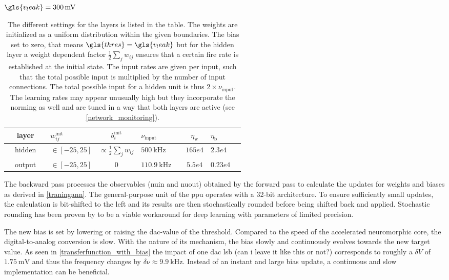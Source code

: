$\gls{v_leak} = \SI{300}{\milli \V}$
\begin{table}\centering{}
	\begin{tabular}{@{}rcllcllcll@{}}\toprule
		&layer	 & & $w_{ij}^\text{init}$		& $b_i^\text{init}$ & $\nu_{\text{input}}$	& & $\eta_\text{w}$	& $\eta_\text{b}$\\ \midrule
		&hidden  & & $\in[-25, 25]$	& $\propto \frac{1}{2} \sum_j w_{ij}$ & $\SI{500}{\kilo \Hz}$	& & $165e4$			& $2.3e4$		\\
		&output  & & $\in[-25, 25]$	& $0$ & $\SI{110.9}{\kilo\Hz}$& & $5.5e4$			& $0.23e4$		\\ \bottomrule
	\end{tabular}
	\caption{The different settings for the layers is listed in the table. The weights are initialized as a uniform distribution within the given boundaries. The bias set to zero, that means $\gls{thres} = \gls{v_leak}$ but for the hidden layer a weight dependent factor $\frac{1}{2} \sum_j w_{ij}$ ensures that a certain fire rate is established at the initial state. The input rates are given per input, such that the total possible input is multiplied by the number of input connections. The total possible input for a hidden unit is thus $2 \times \nu_\text{input}$. The learning rates may appear unusually high but they incorporate the norming as well and are tuned in a way that both layers are active (see \cref{network_monitoring}).}
\end{table}


The backward pass processes the observables (\gls{nuin} and \gls{nuout}) obtained by the forward pass to calculate the updates for weights and biases as derived in \cref{traningann}. The general-purpose unit of the \gls{ppu} operates with a 32-bit architecture. To ensure sufficiently small updates, the calculation is bit-shifted to the left and its results are then stochastically rounded before being shifted back and applied. Stochastic rounding has been proven by \cite{limitedprecisionpaper} to be a viable workaround for deep learning with parameters of limited precision.

The new bias is set by lowering or raising the \gls{dac}-value of the threshold. Compared to the speed of the accelerated neuromorphic core, the digital-to-analog conversion is slow. With the nature of its mechanism, the bias slowly and continuously evolves towards the new target value. As seen in \cref{transferfunction_with_bias} the impact of one \gls{dac} lsb (can i leave it like this or not?) corresponds to roughly a $\delta V$ of $\SI{1.75}{\milli \V}$ and thus the frequency changes by $\delta \nu \approx \SI{9.9}{\kilo \Hz}$. Instead of an instant and large bias update, a continuous and slow implementation can be beneficial.

